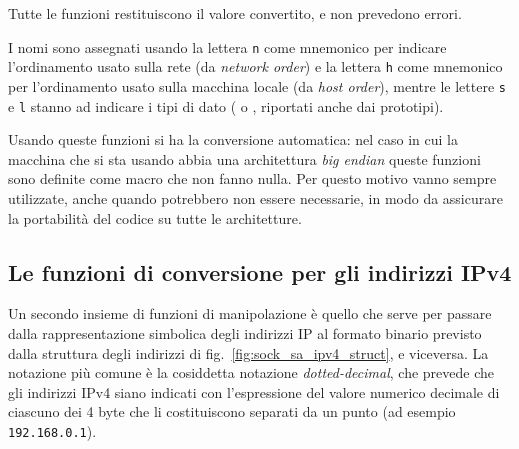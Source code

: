 \begin{funcproto}{
}

{Tutte le funzioni restituiscono il valore convertito, e non prevedono
  errori.}
\end{funcproto}

I nomi sono assegnati usando la lettera \texttt{n} come mnemonico per indicare
l'ordinamento usato sulla rete (da \textit{network order}) e la lettera
\texttt{h} come mnemonico per l'ordinamento usato sulla macchina locale (da
\textit{host order}), mentre le lettere \texttt{s} e \texttt{l} stanno ad
indicare i tipi di dato ( o , riportati anche dai
prototipi).

Usando queste funzioni si ha la conversione automatica: nel caso in cui la
macchina che si sta usando abbia una architettura \textit{big endian} queste
funzioni sono definite come macro che non fanno nulla. Per questo motivo vanno
sempre utilizzate, anche quando potrebbero non essere necessarie, in modo da
assicurare la portabilità del codice su tutte le architetture.


\subsection{Le funzioni di conversione per gli indirizzi IPv4}
\label{sec:sock_func_ipv4}

Un secondo insieme di funzioni di manipolazione è quello che serve per passare
dalla rappresentazione simbolica degli indirizzi IP al formato binario
previsto dalla struttura degli indirizzi di
fig.~\ref{fig:sock_sa_ipv4_struct}, e viceversa. La notazione più comune è la
cosiddetta notazione  \textit{dotted-decimal}, che
prevede che gli indirizzi IPv4 siano indicati con l'espressione del valore
numerico decimale di ciascuno dei 4 byte che li costituiscono separati da un
punto (ad esempio \texttt{192.168.0.1}).

